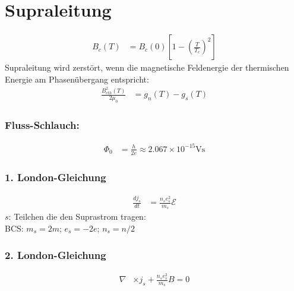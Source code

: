 \section{Supraleitung}

\begin{equation*}
    \begin{aligned}
        B_c(T) &= B_c(0) \left[1- \left(\frac{T}{T_c}\right)^2\right]
    \end{aligned}
\end{equation*}
Supraleitung wird zerstört, wenn die magnetische Feldenergie der thermischen 
Energie am Phasenübergang entspricht:
\begin{equation*}
    \begin{aligned}
        \frac{B_{cth}^2(T)}{2 \mu_0} &= g_n(T) - g_s(T)
    \end{aligned}
\end{equation*}

\subsubsection*{Fluss-Schlauch:}
\begin{equation*}
    \begin{aligned}
        \Phi_0 &= \frac{h}{2e} \approx 2.067 \times 10^{-15} \text{Vs}
    \end{aligned}
\end{equation*}

\subsubsection*{1. London-Gleichung}
\begin{equation*}
    \begin{aligned}
        \frac{dj_s}{dt} &= \frac{n_s e_s^2}{m_s} \mathcal{E}
    \end{aligned}
\end{equation*}
$s$: Teilchen die den Suprastrom tragen:\\
BCS: $m_s = 2m$; $e_s = -2e$; $n_s = n/2$

\subsubsection*{2. London-Gleichung}
\begin{equation*}
    \begin{aligned}
        \nabla &\times j_s + \frac{n_s e_s^2}{m_s} B = 0
    \end{aligned}
\end{equation*}

